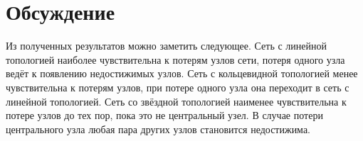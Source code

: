 \documentclass[a4paper,12pt]{article}
\begin{document}
    

    \section{Обсуждение}
    Из полученных результатов можно заметить следующее.
    Сеть с линейной топологией наиболее чувствительна к потерям
    узлов сети, потеря одного узла ведёт к появлению недостижимых узлов.
    Сеть с кольцевидной топологией менее чувствительна к потерям узлов,
    при потере одного узла она переходит в сеть с линейной топологией.
    Сеть со звёздной топологией наименее чувствительна к потере узлов до тех пор,
    пока это не центральный узел.
    В случае потери центрального узла любая пара других узлов становится недостижима. 
\end{document}
